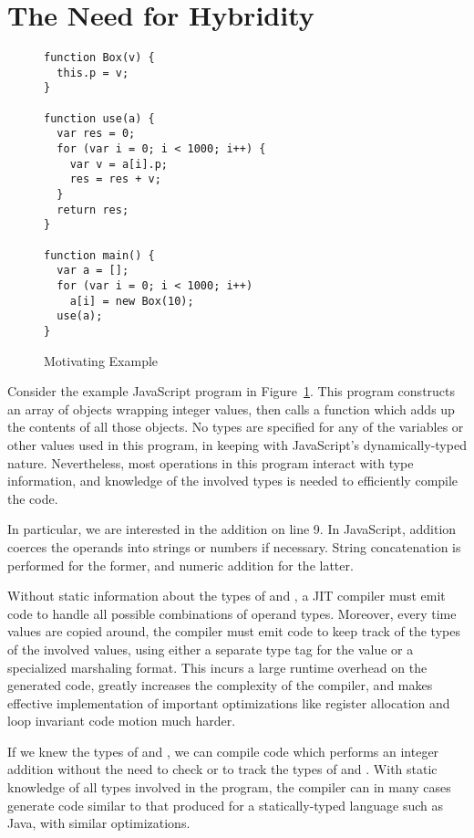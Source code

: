 
\section{The Need for Hybridity}
\label{sec:example}

\begin{figure}
\begin{lstlisting}[xleftmargin=18pt]
function Box(v) {
  this.p = v;
}

function use(a) {
  var res = 0;
  for (var i = 0; i < 1000; i++) {
    var v = a[i].p;
    res = res + v;
  }
  return res;
}

function main() {
  var a = [];
  for (var i = 0; i < 1000; i++)
    a[i] = new Box(10);
  use(a);
}
\end{lstlisting}
\caption{Motivating Example}
\label{fig:motivating-example}
\end{figure}

Consider the example JavaScript program in Figure~\ref{fig:motivating-example}.
This program constructs an array of  objects wrapping integer
values, then calls a  function which adds up the contents of all
those  objects.
No types are specified for any of the variables or other values used
in this program, in keeping with JavaScript's dynamically-typed nature.
Nevertheless, most operations in this program interact with type information,
and knowledge of the involved types is needed to efficiently compile the code.

In particular, we are interested in the addition  on line 9.  In
JavaScript, addition coerces the operands into strings or numbers if
necessary. String concatenation is performed for the former, and numeric
addition for the latter.

Without static information about the types of  and ,
a JIT compiler must emit code to handle all possible combinations of
operand types.
Moreover, every time values are copied around, the compiler must emit
code to keep track of the types of the involved values, using either
a separate type tag for the value or a specialized marshaling format.
This incurs a large runtime overhead on the generated code,
greatly increases the complexity of the compiler,
and makes effective implementation of important optimizations like
register allocation and loop invariant code motion much harder.

If we knew the types of  and , we can compile
code which performs an integer addition without the need to check or
to track the types of  and .
With static knowledge of all types involved in the program, the compiler can
in many cases generate code similar to that produced for a statically-typed
 language such as Java, with similar optimizations.

